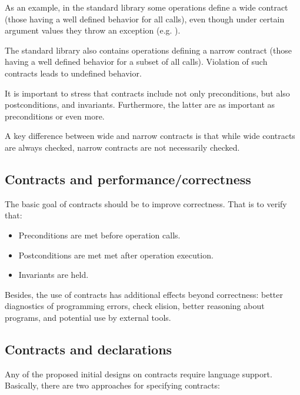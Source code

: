 As an example, in the standard library some operations define a wide contract
(those having a well defined behavior for all calls), even though under certain
argument values they throw an exception (e.g. ).

The standard library also contains operations defining a narrow contract (those
having a well defined behavior for a subset of all calls). Violation of such
contracts leads to undefined behavior.

It is important to stress that contracts include not only preconditions, but
also postconditions, and invariants. Furthermore, the latter are as important as
preconditions or even more.

A key difference between wide and narrow contracts is that while wide contracts
are always checked, narrow contracts are not necessarily checked.


\subsection{Contracts and performance/correctness}

The basic goal of contracts should be to improve correctness. That is to verify
that:

\begin{itemize}
\item Preconditions are met before operation calls.
\item Postconditions are met met after operation execution.
\item Invariants are held.
\end{itemize}

Besides, the use of contracts has additional effects beyond correctness: better
diagnostics of programming errors, check elision, better reasoning about
programs, and potential use by external tools.



\subsection{Contracts and declarations}

Any of the proposed initial designs on contracts require language support.
Basically, there are two approaches for specifying contracts:

